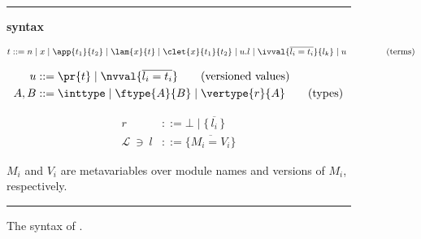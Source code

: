 \begin{figure}[tb]
\centering
\hrule
\medskip
\begin{minipage}{.9\linewidth}
\textbf{\corelang{} syntax}
\end{minipage}
\begin{minipage}{\textwidth}
\vspace{-.7\baselineskip}
\begin{align*}
t &::= n \mid x \mid \app{t_1}{t_2} \mid \lam{x}{t} \mid \clet{x}{t_1}{t_2} \mid  u.l \mid \ivval{\overline{l_i=t_i}}{l_k} \mid u \hspace{2.5em}\tag{terms}\\
\end{align*}
\end{minipage}
\begin{minipage}{\textwidth}
    \vspace{-2.2\baselineskip}
    \begin{minipage}{.5\textwidth}
    \begin{align*}
    u &::= \pr{t} \mid \nvval{\overline{l_i=t_i}} \tag{versioned values}\\ %
    A, B &::= \inttype \mid \ftype{A}{B} \mid \vertype{r}{A} \tag{types}
    \end{align*}
    \end{minipage}
    \begin{minipage}{.5\textwidth}
    \begin{align*}
    r    &::= \bot \mid \{\,\overline{l_i}\,\} \tag{resources}\\
    \mathcal{L}\ \ni\ l&::= \{\overline{M_i = V_i}\} \tag{version labels}
    \end{align*}
    \end{minipage}
\end{minipage}
\parbox[t]{\linewidth}{\smallskip
\small $M_i$ and $V_i$ are metavariables over module names and versions of $M_i$, respectively.}
\smallskip
\hrule
\caption{The syntax of \corelang{}.}
\label{syntax:lambdavl}
\end{figure}